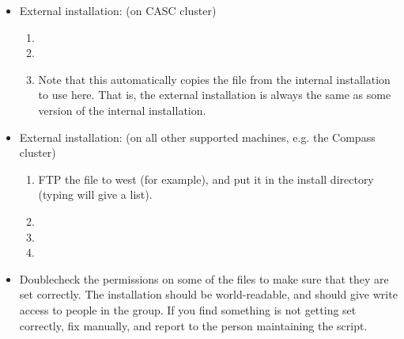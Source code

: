 \begin{itemize}
\begin{enumerate}
\end{enumerate}

\item External installation: (on CASC cluster)
\begin{enumerate}

   \item {}

   \item {}

   \item Note that this automatically copies the 
   file from the internal installation to use here.  That is, the
   external installation is always the same as some version of the
   internal installation.

\end{enumerate}

\item External installation: (on all other supported machines,
e.g. the Compass cluster)
\begin{enumerate}

   \item FTP the file  to west (for example), and put it
   in the install directory (typing  will give a list).

   \item {}

   \item {}

   \item {}

\end{enumerate}

\item Doublecheck the permissions on some of the files to make sure that
they are set correctly.  The installation should be world-readable,
and should give write access to people in the  group.  If
you find something is not getting set correctly, fix manually, and
report to the person maintaining the  script.

\end{itemize}

